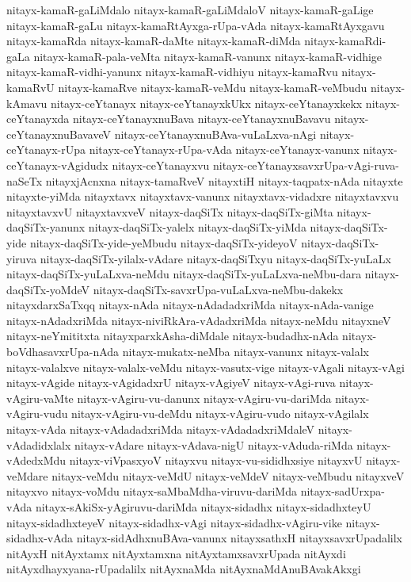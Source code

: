 {nitayx-kamaR-gaLiMdalo
nitayx-kamaR-gaLiMdaloV
nitayx-kamaR-gaLige
nitayx-kamaR-gaLu
nitayx-kamaRtAyxga-rUpa-vAda
nitayx-kamaRtAyxgavu
nitayx-kamaRda
nitayx-kamaR-daMte
nitayx-kamaR-diMda
nitayx-kamaRdi-gaLa
nitayx-kamaR-pala-veMta
nitayx-kamaR-vanunx
nitayx-kamaR-vidhige
nitayx-kamaR-vidhi-yanunx
nitayx-kamaR-vidhiyu
nitayx-kamaRvu
nitayx-kamaRvU
nitayx-kamaRve
nitayx-kamaR-veMdu
nitayx-kamaR-veMbudu
nitayx-kAmavu
nitayx-ceYtanayx
nitayx-ceYtanayxkUkx
nitayx-ceYtanayxkekx
nitayx-ceYtanayxda
nitayx-ceYtanayxnuBava
nitayx-ceYtanayxnuBavavu
nitayx-ceYtanayxnuBavaveV
nitayx-ceYtanayxnuBAva-vuLaLxva-nAgi
nitayx-ceYtanayx-rUpa
nitayx-ceYtanayx-rUpa-vAda
nitayx-ceYtanayx-vanunx
nitayx-ceYtanayx-vAgidudx
nitayx-ceYtanayxvu
nitayx-ceYtanayxsavxrUpa-vAgi-ruva-naSeTx
nitayxjAcnxna
nitayx-tamaRveV
nitayxtiH
nitayx-taqpatx-nAda
nitayxte
nitayxte-yiMda
nitayxtavx
nitayxtavx-vanunx
nitayxtavx-vidadxre
nitayxtavxvu
nitayxtavxvU
nitayxtavxveV
nitayx-daqSiTx
nitayx-daqSiTx-giMta
nitayx-daqSiTx-yanunx
nitayx-daqSiTx-yalelx
nitayx-daqSiTx-yiMda
nitayx-daqSiTx-yide
nitayx-daqSiTx-yide-yeMbudu
nitayx-daqSiTx-yideyoV
nitayx-daqSiTx-yiruva
nitayx-daqSiTx-yilalx-vAdare
nitayx-daqSiTxyu
nitayx-daqSiTx-yuLaLx
nitayx-daqSiTx-yuLaLxva-neMdu
nitayx-daqSiTx-yuLaLxva-neMbu-dara
nitayx-daqSiTx-yoMdeV
nitayx-daqSiTx-savxrUpa-vuLaLxva-neMbu-dakekx
nitayxdarxSaTxqq
nitayx-nAda
nitayx-nAdadadxriMda
nitayx-nAda-vanige
nitayx-nAdadxriMda
nitayx-niviRkAra-vAdadxriMda
nitayx-neMdu
nitayxneV
nitayx-neYmititxta
nitayxparxkAsha-diMdale
nitayx-budadhx-nAda
nitayx-boVdhasavxrUpa-nAda
nitayx-mukatx-neMba
nitayx-vanunx
nitayx-valalx
nitayx-valalxve
nitayx-valalx-veMdu
nitayx-vasutx-vige
nitayx-vAgali
nitayx-vAgi
nitayx-vAgide
nitayx-vAgidadxrU
nitayx-vAgiyeV
nitayx-vAgi-ruva
nitayx-vAgiru-vaMte
nitayx-vAgiru-vu-danunx
nitayx-vAgiru-vu-dariMda
nitayx-vAgiru-vudu
nitayx-vAgiru-vu-deMdu
nitayx-vAgiru-vudo
nitayx-vAgilalx
nitayx-vAda
nitayx-vAdadadxriMda
nitayx-vAdadadxriMdaleV
nitayx-vAdadidxlalx
nitayx-vAdare
nitayx-vAdava-nigU
nitayx-vAduda-riMda
nitayx-vAdedxMdu
nitayx-viVpasxyoV
nitayxvu
nitayx-vu-sididhxsiye
nitayxvU
nitayx-veMdare
nitayx-veMdu
nitayx-veMdU
nitayx-veMdeV
nitayx-veMbudu
nitayxveV
nitayxvo
nitayx-voMdu
nitayx-saMbaMdha-viruvu-dariMda
nitayx-sadUrxpa-vAda
nitayx-sAkiSx-yAgiruvu-dariMda
nitayx-sidadhx
nitayx-sidadhxteyU
nitayx-sidadhxteyeV
nitayx-sidadhx-vAgi
nitayx-sidadhx-vAgiru-vike
nitayx-sidadhx-vAda
nitayx-sidAdhxnuBAva-vanunx
nitayxsathxH
nitayxsavxrUpadalilx
nitAyxH
nitAyxtamx
nitAyxtamxna
nitAyxtamxsavxrUpada
nitAyxdi
nitAyxdhayxyana-rUpadalilx
nitAyxnaMda
nitAyxnaMdAnuBAvakAkxgi
}
